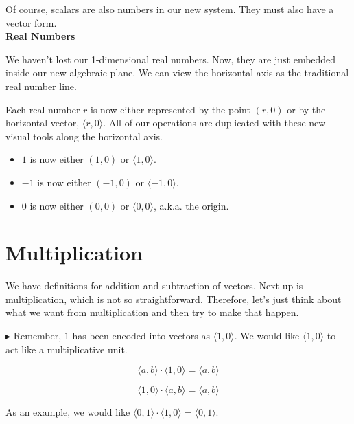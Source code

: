 \documentclass{ximera}
\begin{document}
Of course, scalars are also numbers in our new system.  They must also have a vector form. \\




\textbf{Real Numbers}



We haven't lost our 1-dimensional real numbers. Now, they are just embedded inside our new algebraic plane.  We can view the horizontal axis as the traditional real number line.

Each real number $r$ is now either represented by the point $(r,0)$ or by the horizontal vector, $\langle r, 0 \rangle$.  All of our operations are duplicated with these new visual tools along the horizontal axis.


\begin{itemize}
\item $1$ is now either $(1,0)$ or $\langle 1, 0 \rangle$.
\item $-1$ is now either $(-1,0)$ or $\langle -1, 0 \rangle$.
\item $0$ is now either $(0,0)$ or $\langle 0, 0 \rangle$, a.k.a. the origin.
\end{itemize}














\section{Multiplication}



We have definitions for addition and subtraction of vectors.  Next up is multiplication, which is not so straightforward.  Therefore, let's just think about what we want from multiplication and then try to make that happen.

\textbf{\textcolor{red!90!darkgray}{$\blacktriangleright$}} Remember, $1$ has been encoded into vectors as $\langle 1, 0 \rangle$.  We would like $\langle 1, 0 \rangle$ to act like a multiplicative unit.

\[    \langle a, b \rangle \cdot \langle 1, 0 \rangle    = \langle a, b \rangle            \]

\[    \langle 1, 0 \rangle \cdot \langle a, b \rangle    = \langle a, b \rangle            \]


As an example, we would like $\langle 0, 1 \rangle \cdot \langle 1, 0 \rangle    = \langle 0, 1 \rangle $.
\end{document}
